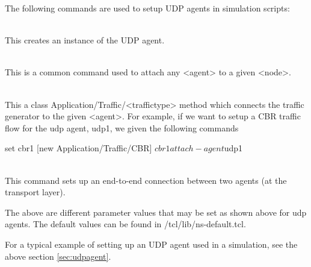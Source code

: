 The following commands are used to setup UDP agents in simulation scripts:
\begin{flushleft}
\\
This creates an instance of the UDP agent.


\\
This is a common command used to attach any <agent> to a given <node>.


\\
This a class Application/Traffic/<traffictype> method which connects the
traffic generator to the given <agent>. For example, if we want to setup
a CBR traffic flow for the udp agent, udp1, we given the following commands\\
\begin{program}
set cbr1 [new Application/Traffic/CBR]
$cbr1 attach-agent $udp1
\end{program}


\\
This command sets up an end-to-end connection between two agents (at the
transport layer).



The above are different parameter values that may be set as shown above
for udp agents. The default values can be found in 
\ns/tcl/lib/ns-default.tcl.

For a typical example of setting up an UDP agent used in a simulation, see
the above section \ref{sec:udpagent}.

\end{flushleft}

\endinput
